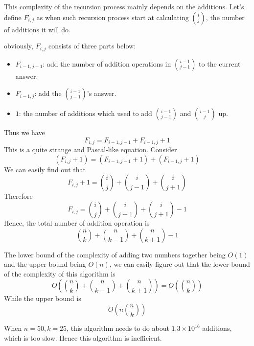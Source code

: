This complexity of the recursion process mainly depends on the additions.
Let's define $F_{i, j}$ as when such recursion process start at calculating $\binom{i}{j}$, 
the number of additions it will do.

obviously, $F_{i, j}$ consists of three parts below:
\begin{itemize}
\item $F_{i - 1, j - 1}$: add the number of addition operations in $\binom{i - 1}{j - 1}$ to the current answer.
\item $F_{i - 1, j}$: add the $\binom{i - 1}{j - 1}$'s answer.
\item $1$: the number of additions which used to add $\binom{i - 1}{j - 1}$ and $\binom{i - 1}{j}$ up.
\end{itemize}

Thus we have
\begin{equation}\label{equation3}
F_{i, j} = F_{i - 1, j - 1} + F_{i - 1, j} + 1
\end{equation}
This is a quite strange and Pascal-like equation.
Consider
\[(F_{i, j} + 1) = (F_{i - 1, j - 1} + 1) + (F_{i-1, j} + 1)\]
We can easily find out that
\[F_{i, j} + 1 = \binom{i}{j} + \binom{i}{j-1} + \binom{i}{j+1}\]
Therefore
\begin{equation}\label{equation4}
F_{i, j} = \binom{i}{j} + \binom{i}{j-1} + \binom{i}{j+1} - 1
\end{equation}
Hence, the total number of addition operation is
\[\binom{n}{k} + \binom{n}{k-1} + \binom{n}{k+1} - 1\]

The lower bound of the complexity of adding two numbers together being $O(1)$ and the upper bound being $O(n)$,
we can easily figure out that the lower bound of the complexity of this algorithm is
\[O\left(\binom{n}{k} + \binom{n}{k-1} + \binom{n}{k+1}\right) = O\left(\binom{n}{k}\right)\]
While the upper bound is 
\[O\left(n\binom{n}{k}\right)\]

When $n = 50, k = 25$, this algorithm needs to do about $1.3 \times 10^{16}$ additions, which is too slow. Hence this algorithm is inefficient. 

